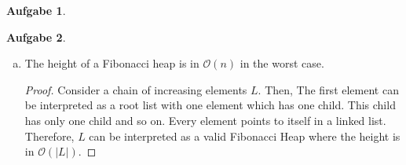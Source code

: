 \documentclass[a4paper,12pt,headsepline]{scrartcl}
\newtheorem{aufgabe}{Aufgabe}
\begin{document}
\newpage
\begin{aufgabe}
\end{aufgabe}

\newpage
\begin{aufgabe}
\end{aufgabe}

\begin{enumerate}[a)]
	\item The height of a Fibonacci heap is in $\mathcal{O}(n)$ in the worst case.
	\begin{proof}
		Consider a chain of increasing elements $L$. Then, The first element can be interpreted as a root list with one element which has one child. This child has only one child and so on. Every element points to itself in a linked list. Therefore, $L$ can be interpreted as a valid Fibonacci Heap where the height is in $\mathcal{O}(|L|)$.
	\end{proof}
\end{enumerate}
\end{document}

